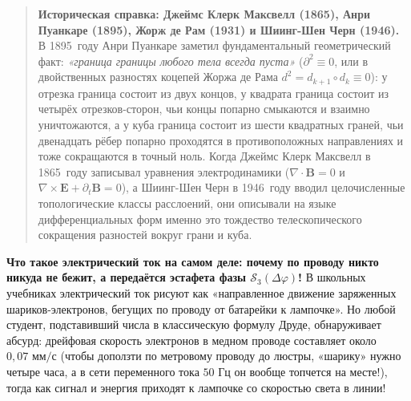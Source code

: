 \begin{quote}
\small\textbf{Историческая справка: Джеймс Клерк Максвелл (1865), Анри Пуанкаре (1895), Жорж де Рам (1931) и Шиинг-Шен Черн (1946).}
В 1895~году Анри Пуанкаре заметил фундаментальный геометрический факт: \emph{«граница границы любого тела всегда пуста»} ($\partial^2 \equiv 0$, или в двойственных разностях коцепей Жоржа де Рама $d^2 = d_{k+1}\circ d_k \equiv 0$): у отрезка граница состоит из двух концов, у квадрата граница состоит из четырёх отрезков-сторон, чьи концы попарно смыкаются и взаимно уничтожаются, а у куба граница состоит из шести квадратных граней, чьи двенадцать рёбер попарно проходятся в противоположных направлениях и тоже сокращаются в точный ноль. Когда Джеймс Клерк Максвелл в 1865~году записывал уравнения электродинамики ($\nabla\cdot\mathbf{B} = 0$ и $\nabla\times\mathbf{E} + \partial_t\mathbf{B} = 0$), а Шиинг-Шен Черн в 1946~году вводил целочисленные топологические классы расслоений, они описывали на языке дифференциальных форм именно это тождество телескопического сокращения разностей вокруг грани и куба.
\end{quote}

\medskip
\noindent\textbf{Что такое электрический ток на самом деле: почему по проводу никто никуда не бежит, а передаётся эстафета фазы $\mathcal{S}_3(\Delta\varphi)$!}
В школьных учебниках электрический ток рисуют как «направленное движение заряженных шариков-электронов, бегущих по проводу от батарейки к лампочке». Но любой студент, подставивший числа в классическую формулу Друде, обнаруживает абсурд: дрейфовая скорость электронов в медном проводе составляет около $0{,}07\text{ мм/с}$ (чтобы доползти по метровому проводу до люстры, «шарику» нужно четыре часа, а в сети переменного тока $50\text{ Гц}$ он вообще топчется на месте!), тогда как сигнал и энергия приходят к лампочке со скоростью света в линии!

